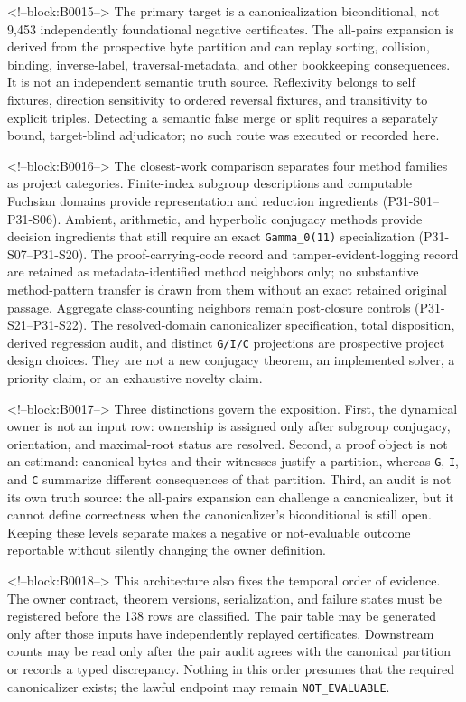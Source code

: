 \documentclass[11pt]{article}
\begin{document}
<!--block:B0015-->
The primary target is a canonicalization biconditional, not 9,453 independently
foundational negative certificates.  The all-pairs expansion is derived from the
prospective byte partition and can replay sorting, collision, binding,
inverse-label, traversal-metadata, and other bookkeeping consequences.  It is not
an independent semantic truth source.  Reflexivity belongs to self fixtures,
direction sensitivity to ordered reversal fixtures, and transitivity to explicit
triples.  Detecting a semantic false merge or split requires a separately bound,
target-blind adjudicator; no such route was executed or recorded here.

<!--block:B0016-->
The closest-work comparison separates four method families as project
categories. Finite-index subgroup descriptions and computable Fuchsian domains
provide representation and reduction ingredients (P31-S01--P31-S06). Ambient,
arithmetic, and hyperbolic conjugacy methods provide decision ingredients that
still require an exact \texttt{Gamma\_0(11)} specialization
(P31-S07--P31-S20). The proof-carrying-code record \citep{P31-S23} and
tamper-evident-logging record \citep{P31-S24} are retained as metadata-identified
method neighbors only; no substantive method-pattern transfer is drawn from
them without an exact retained original passage. Aggregate class-counting
neighbors remain post-closure controls (P31-S21--P31-S22). The resolved-domain
canonicalizer specification, total disposition, derived regression audit, and
distinct \texttt{G/I/C} projections are prospective project design choices.
They are not a new conjugacy theorem, an implemented solver, a priority claim,
or an exhaustive novelty claim.

<!--block:B0017-->
Three distinctions govern the exposition. First, the dynamical owner is
not an input row: ownership is assigned only after subgroup conjugacy,
orientation, and maximal-root status are resolved. Second, a proof
object is not an estimand: canonical bytes and their witnesses justify a
partition, whereas \texttt{G}, \texttt{I}, and \texttt{C} summarize
different consequences of that partition. Third, an audit is not its
own truth source: the all-pairs expansion can challenge a canonicalizer,
but it cannot define correctness when the canonicalizer's biconditional
is still open. Keeping these levels separate makes a negative or
not-evaluable outcome reportable without silently changing the owner
definition.

<!--block:B0018-->
This architecture also fixes the temporal order of evidence. The owner
contract, theorem versions, serialization, and failure states must be
registered before the 138 rows are classified. The pair table may be
generated only after those inputs have independently replayed
certificates. Downstream counts may be read only after the pair audit
agrees with the canonical partition or records a typed discrepancy.
Nothing in this order presumes that the required canonicalizer exists;
the lawful endpoint may remain \texttt{NOT\_EVALUABLE}.
\end{document}
